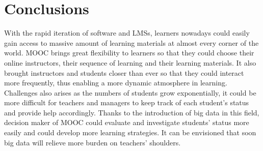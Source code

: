 \documentclass[sigconf]{acmart}
\begin{document}
\section{Conclusions}
With the rapid iteration of software and LMSs, learners nowadays could easily gain access to massive amount of learning materials at almost every corner of the world. MOOC brings great flexibility to learners so that they could choose their online instructors, their sequence of learning and their learning materials. It also brought instructors and students closer than ever so that they could interact more frequently, thus enabling a more dynamic atmosphere in learning. Challenges also arises as the numbers of students grow exponentially, it could be more difficult for teachers and managers to keep track of each student’s status and provide help accordingly. Thanks to the introduction of big data in this field, decision maker of MOOC could evaluate and investigate students’ status more easily and could develop more learning strategies. It can be envisioned that soon big data will relieve more burden on teachers’ shoulders.




 
\end{document}
